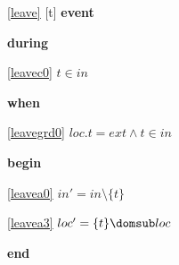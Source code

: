 \noindent \ref{leave} [t] \textbf{event}
\begin{block}
\item \textbf{during}
\begin{block}
\item[ \eqref{leavec0} ]$t \in in	$ %
\end{block}
\item \textbf{when}
\begin{block}
\item[ \eqref{leavegrd0} ]$loc.t = ext \land t \in in	$ %
\end{block}
\item \textbf{begin}
\begin{block}
\item[ \eqref{leavea0} ]$in' = in \setminus \{ t \}	$ %
\item[ \eqref{leavea3} ]$loc' = \{ t \} \domsub loc 	$ %
\end{block}
\item \textbf{end} \\
\end{block}
